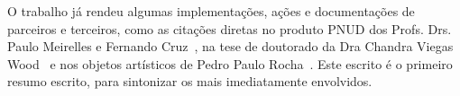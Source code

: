 \documentclass[a4paper, 11pt]{article} %
\begin{document}
O trabalho já rendeu algumas implementações, ações e documentações de parceiros e terceiros, como as citações diretas no produto PNUD dos Profs. Drs. Paulo Meirelles e Fernando Cruz~\cite{paulo6}, na tese de doutorado da Dra Chandra Viegas Wood~\cite{chandra} e nos objetos artísticos de Pedro Paulo Rocha~\cite{pedro}. Este escrito é o primeiro resumo escrito, para sintonizar os mais imediatamente envolvidos.

%



\end{document}
